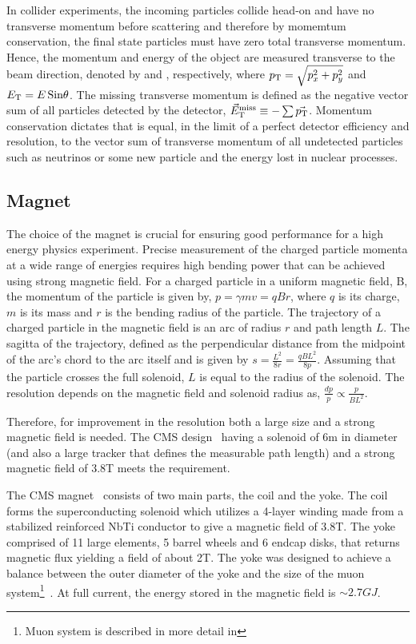 In collider experiments, the incoming particles collide head-on and have no transverse momentum before scattering and therefore by momemtum 
conservation, the final state particles must have zero total transverse momentum. Hence, the momentum and energy of the object are measured 
transverse to the beam direction, denoted by \pt and \et, respectively, where $p_{\mathrm T} = \sqrt{p_{x}^{2} + p_{y}^{2}}$ and $E_{\mathrm T} = E\,\text{Sin}\theta$.
The missing transverse momentum is defined as the negative vector sum of all particles detected by the detector, $\vec{E}_{\mathrm{T}}^{\text{miss}}\equiv -\sum \vec{p_{\mathrm T}}$.
Momentum conservation dictates that \metVec is equal, in the limit of a perfect detector efficiency and resolution, to the vector sum of transverse 
momentum of all undetected particles such as neutrinos or some new particle and the energy lost in nuclear processes.

\subsection{Magnet}
The choice of the magnet is crucial for ensuring good performance for a high energy physics experiment. Precise measurement of the charged
particle momenta at a wide range of energies requires high bending power that can be achieved using strong magnetic field. For a charged
particle in a uniform magnetic field, B, the momentum of the particle is given by, $p=\gamma{mv}=qBr$, where $q$ is its charge, $m$ is its
mass and $r$ is the bending radius of the particle. The trajectory of a charged particle in the magnetic field is an arc of radius $r$ and path 
length $L$. The sagitta of the trajectory, defined as the perpendicular distance from the midpoint of the arc's chord to the arc itself and is given 
by $s = \frac{L^{2}}{8r} = \frac{qBL^{2}}{8p}$. Assuming that the particle crosses the full solenoid, $L$ is equal to the radius of the solenoid.
The \pt resolution depends on the magnetic field and solenoid radius as, $\frac{dp}{p}\propto\frac{p}{BL^{2}}$.

Therefore, for improvement in the resolution both a large size and a strong magnetic field is needed. The CMS design~\cite{cmsMagnet} having a 
solenoid of 6\unit{m} in diameter (and also a large tracker that defines the measurable path length) and a strong magnetic field of 3.8\unit{T} meets 
the requirement.

The CMS magnet~\cite{cmsMagnet} consists of two main parts, the coil and the yoke. The coil forms the superconducting solenoid which utilizes a 
4-layer winding made from a stabilized reinforced NbTi conductor to give a magnetic field of 3.8\unit{T}. The yoke comprised of 11 large elements, 
5 barrel wheels and 6 endcap disks, that returns magnetic flux yielding a field of about 2\unit{T}. The yoke was designed to achieve a balance
between the outer diameter of the yoke and the size of the muon system\footnote{Muon system is described in more detail in \sectn{\ref{sec:muon}}}~\cite{Chatrchyan:2008aa}. At full current, the energy stored in the
magnetic field is $\sim2.7\unit{GJ}$.

